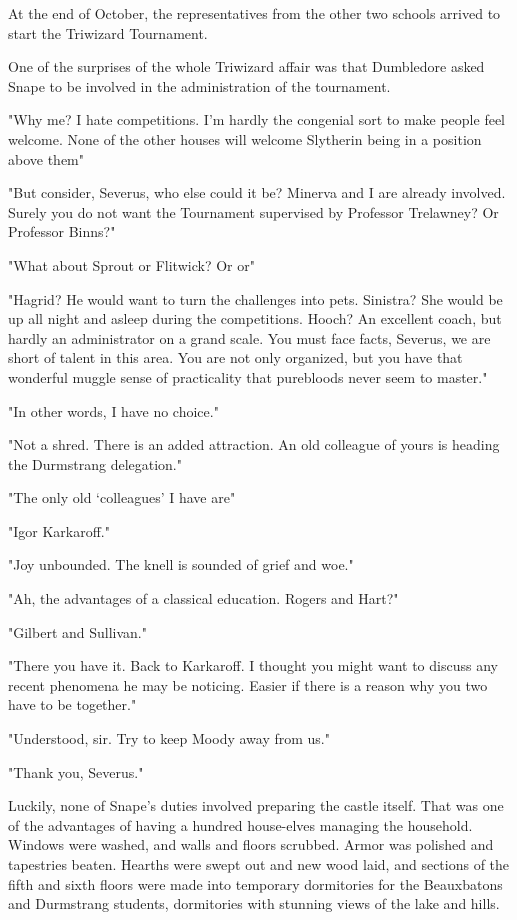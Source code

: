 At the end of October, the representatives from the other two schools arrived to start the Triwizard Tournament.

One of the surprises of the whole Triwizard affair was that Dumbledore asked Snape to be involved in the administration of the tournament.

"Why me? I hate competitions. I'm hardly the congenial sort to make people feel welcome. None of the other houses will welcome Slytherin being in a position above them{\el}"

"But consider, Severus, who else could it be? Minerva and I are already involved. Surely you do not want the Tournament supervised by Professor Trelawney? Or Professor Binns?"

"What about Sprout or Flitwick? Or{\el} or{\el}"

"Hagrid? He would want to turn the challenges into pets. Sinistra? She would be up all night and asleep during the competitions. Hooch? An excellent coach, but hardly an administrator on a grand scale. You must face facts, Severus, we are short of talent in this area. You are not only organized, but you have that wonderful muggle sense of practicality that purebloods never seem to master."

"In other words, I have no choice."

"Not a shred. There is an added attraction. An old{\el} colleague of yours is heading the Durmstrang delegation."

"The only old `colleagues' I have are{\el}"

"Igor Karkaroff."

"Joy unbounded. The knell is sounded of grief and woe."

"Ah, the advantages of a classical education. Rogers and Hart?"

"Gilbert and Sullivan."

"There you have it. Back to Karkaroff. I thought you might want to discuss any recent phenomena he may be noticing. Easier if there is a reason why you two have to be together."

"Understood, sir. Try to keep Moody away from us."

"Thank you, Severus."

Luckily, none of Snape's duties involved preparing the castle itself. That was one of the advantages of having a hundred house-elves managing the household. Windows were washed, and walls and floors scrubbed. Armor was polished and tapestries beaten. Hearths were swept out and new wood laid, and sections of the fifth and sixth floors were made into temporary dormitories for the Beauxbatons and Durmstrang students, dormitories with stunning views of the lake and hills.

